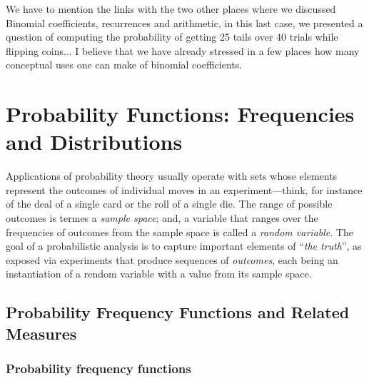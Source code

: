 
{\Denis We have to mention the links with the two other places where we discussed Binomial coefficients, recurrences and arithmetic, in this last case, we presented a question of computing the probability of getting 25 tails over 40 trials while flipping coins...}
{\Arny I believe that we have already stressed in a few places how many conceptual uses one can make of 
binomial coefficients.}


\section{Probability Functions: Frequencies and Distributions}
\label{sec:prob-distributions}

 

Applications of probability theory usually operate with sets whose
elements represent the outcomes of individual moves in an
experiment---think, for instance of the deal of a single card or the
roll of a single die.  The range of possible outcomes is termes a {\it
  sample space}; and, a variable that ranges over the frequencies of
outcomes from the sample space is called a {\it random variable}.  The
goal of a probabilistic analysis is to capture important elements of
``{\em the truth}'', as exposed via experiments that produce sequences
of {\em outcomes}, each being an instantiation of a rendom variable
with a value from its sample space.


\subsection{Probability Frequency Functions and Related Measures}
\label{sec:prob-freq-fns+measures}

\subsubsection{Probability frequency functions}
\label{sec:prob-freq-fns}

